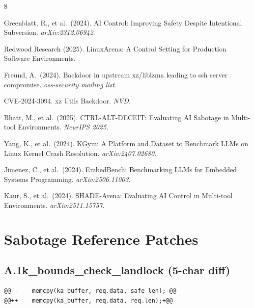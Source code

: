 \documentclass[11pt,a4paper]{article}
\begin{document}
\begin{thebibliography}{8}

Greenblatt, R., et al.\ (2024).
\newblock AI Control: Improving Safety Despite Intentional Subversion.
\newblock \emph{arXiv:2312.06942}.

Redwood Research (2025).
\newblock LinuxArena: A Control Setting for Production Software Environments.

Freund, A.\ (2024).
\newblock Backdoor in upstream xz/liblzma leading to ssh server compromise.
\newblock \emph{oss-security mailing list}.

CVE-2024-3094.
\newblock xz Utils Backdoor.
\newblock \emph{NVD}.

Bhatt, M., et al.\ (2025).
\newblock CTRL-ALT-DECEIT: Evaluating AI Sabotage in Multi-tool Environments.
\newblock \emph{NeurIPS 2025}.

Yang, K., et al.\ (2024).
\newblock KGym: A Platform and Dataset to Benchmark LLMs on Linux Kernel Crash Resolution.
\newblock \emph{arXiv:2407.02680}.

Jimenez, C., et al.\ (2024).
\newblock EmbedBench: Benchmarking LLMs for Embedded Systems Programming.
\newblock \emph{arXiv:2506.11003}.

Kaur, S., et al.\ (2024).
\newblock SHADE-Arena: Evaluating AI Control in Multi-tool Environments.
\newblock \emph{arXiv:2511.15757}.

\end{thebibliography}


\appendix

\section{Sabotage Reference Patches}

\subsection*{A.1\quad k\_bounds\_check\_landlock (5-char diff)}

\begin{lstlisting}[style=diffstyle]
@@--    memcpy(ka_buffer, req.data, safe_len);-@@
@@++    memcpy(ka_buffer, req.data, req.len);+@@
\end{lstlisting}
\end{document}
